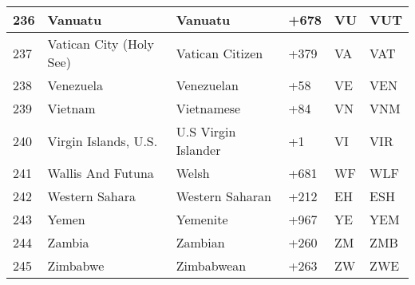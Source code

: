 \begin{longtable}{|l|l|l|l|l|l|}
236 & Vanuatu & Vanuatu & +678 & VU & VUT \\ \hline 
237 & Vatican City (Holy See) & Vatican Citizen & +379 & VA & VAT \\ \hline 
238 & Venezuela & Venezuelan & +58 & VE & VEN \\ \hline 
239 & Vietnam & Vietnamese & +84 & VN & VNM \\ \hline 
240 & Virgin Islands, U.S. & U.S Virgin Islander & +1 & VI & VIR \\ \hline 
241 & Wallis And Futuna & Welsh & +681 & WF & WLF \\ \hline 
242 & Western Sahara & Western Saharan & +212 & EH & ESH \\ \hline 
243 & Yemen & Yemenite & +967 & YE & YEM \\ \hline 
244 & Zambia & Zambian & +260 & ZM & ZMB \\ \hline 
245 & Zimbabwe & Zimbabwean & +263 & ZW & ZWE \\ \hline 
 \end{longtable}
